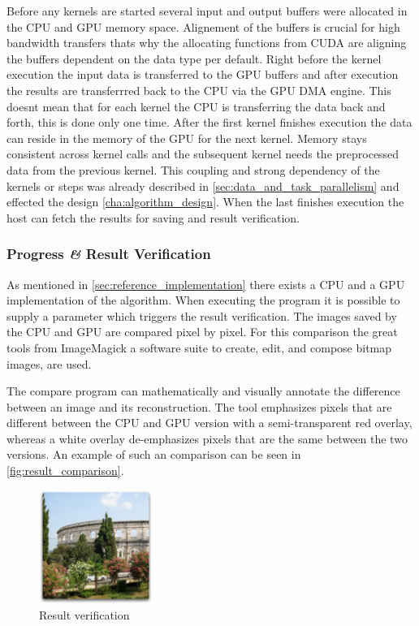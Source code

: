 Before any kernels are started several input and output buffers were allocated
in the \gls{CPU} and \gls{GPU} memory space. Alignement of the buffers is
crucial for high bandwidth transfers thats why the allocating functions from
\gls{CUDA} are aligning the buffers dependent on the data type per default.
Right before the kernel execution the input data is transferred to the \gls{GPU}
buffers and after execution the results are transferrred back to the \gls{CPU}
via the \gls{GPU} \gls{DMA} engine. This doesnt mean that for each kernel the
\gls{CPU} is transferring the data back and forth, this is done only one time.
After the first kernel finishes execution the data can reside in the memory of
the \gls{GPU} for the next kernel. Memory stays consistent across kernel calls
and the subsequent kernel needs the preprocessed data from the previous kernel.
This coupling and strong dependency of the kernels or steps was already
described in \autoref{sec:data_and_task_parallelism} and effected the design
\autoref{cha:algorithm_design}. When the last finishes execution the
host can fetch the results for saving and result verification. 

\subsubsection{Progress \textit{\&} Result Verification} %
\label{ssub:progress_result_verificationcation}
As mentioned in \autoref{sec:reference_implementation} there exists a \gls{CPU}
and a \gls{GPU} implementation of the algorithm. When executing the program
it is possible to supply a parameter which triggers the result verification. The
images saved by the \gls{CPU} and \gls{GPU} are compared pixel by pixel. For 
this comparison the great tools from ImageMagick a software suite to 
create, edit, and compose bitmap images, are used. 

The compare program can mathematically and visually annotate the difference 
between an image and its reconstruction. The tool emphasizes pixels that are 
different between the \gls{CPU} and \gls{GPU} version with a semi-transparent red
overlay, whereas a white overlay de-emphasizes pixels that are the same between
the two versions. An example of such an comparison can be seen in 
\autoref{fig:result_comparison}.

\begin{figure}[ht]
  \centering
 	\includegraphics[width=0.33\textwidth]{gfx/source}
  \caption{Result verification}
  \label{fig:result_comparison}
\end{figure}

